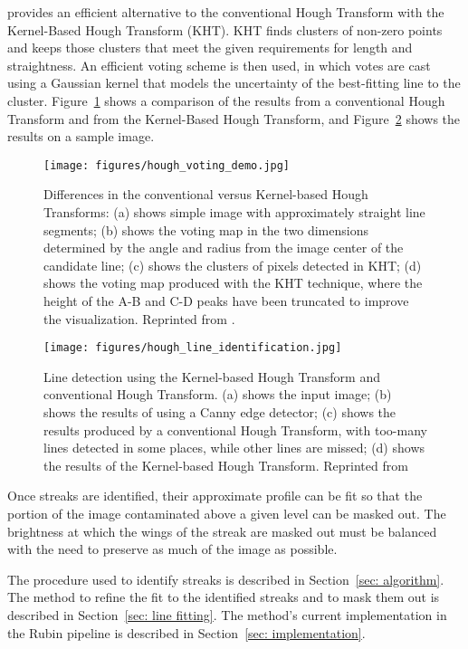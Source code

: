 \documentclass[DM,authoryear,toc]{lsstdoc}
\begin{document}
\cite{fernandes:2008} provides an efficient alternative to the conventional Hough Transform with the Kernel-Based Hough Transform (KHT). KHT finds clusters of non-zero points and keeps those clusters that meet the given requirements for length and straightness. An efficient voting scheme is then used, in which votes are cast using a Gaussian kernel that models the uncertainty of the best-fitting line to the cluster. Figure~\ref{fig: hough demo} shows a comparison of the results from a conventional Hough Transform and from the Kernel-Based Hough Transform, and Figure~\ref{fig: hough results} shows the results on a sample image.
\begin{figure}
\centering
\texttt{[image: figures/hough\_voting\_demo.jpg]}
\caption{Differences in the conventional versus Kernel-based Hough Transforms: (a) shows simple image with approximately straight line segments; (b) shows the voting map in the two dimensions determined by the angle and radius from the image center of the candidate line; (c) shows the clusters of pixels detected in KHT; (d) shows the voting map produced with the KHT technique, where the height of the A-B and C-D peaks have been truncated to improve the visualization. Reprinted from \cite{fernandes:2008}.}
\label{fig: hough demo}
\end{figure}
\begin{figure}
\centering
\texttt{[image: figures/hough\_line\_identification.jpg]}
\caption{Line detection using the Kernel-based Hough Transform and conventional Hough Transform. (a) shows the input image; (b) shows the results of using a Canny edge detector; (c) shows the results produced by a conventional Hough Transform, with too-many lines detected in some places, while other lines are missed; (d) shows the results of the Kernel-based Hough Transform. Reprinted from \cite{fernandes:2008}}
\label{fig: hough results}
\end{figure}


Once streaks are identified, their approximate profile can be fit so that the portion of the image contaminated above a given level can be masked out. The brightness at which the wings of the streak are masked out must be balanced with the need to preserve as much of the image as possible.

The procedure used to identify streaks is described in Section~\ref{sec: algorithm}. The method to refine the fit to the identified streaks and to mask them out is described in Section~\ref{sec: line fitting}. The method's current implementation in the Rubin pipeline is described in Section~\ref{sec: implementation}.
\end{document}
